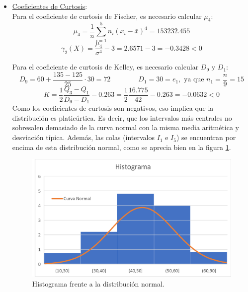 \begin{ejercicio}
\begin{enumerate}
\begin{itemize}
            \item \underline{Coeficientes de Curtosis}:\\
            Para el coeficiente de curtosis de Fischer, es necesario calcular $\mu_4$:
            $$\mu_4 = \frac{1}{n}\sum_{i=1}^5n_i(x_i-\bar{x})^4 = 153232.455$$
            $$\gamma_2(X) = \frac{\mu_4}{\sigma^4} -3 = 2.6571-3 = -0.3428 < 0$$
            
            Para el coeficiente de curtosis de Kelley, es necesario calcular $D_9$ y $D_1$:
            $$D_{9} = 60 + \frac{135-125}{25}\cdot 30 = 72
            \qquad \qquad
            D_{1} = 30 = e_1,\text{ ya que } n_1 = \frac{n}{9}=15$$
            $$K=\frac{1}{2}\frac{Q_3-Q_1}{D_9-D_1}-0.263 =
            \frac{1}{2}\frac{16.775}{42}-0.263 = -0.0632 < 0$$
            Como los coeficientes de curtosis son negativos, eso implica que la distribución es platicúrtica. Es decir, que los intervalos más centrales no sobresalen demasiado de la curva normal con la misma media aritmética y desviación típica. Además, las colas (intervalos $I_1$ e $I_5$) se encuentran por encima de esta distribución normal, como se aprecia bien en la figura \ref{fig:Ej10.Curtosis}.
            \begin{figure}[H]
                \centering
                \includegraphics[width=0.8\linewidth]{Imagenes/Ej10.Curtosis.png}
                \caption{Histograma frente a la distribución normal.}
                \label{fig:Ej10.Curtosis}
            \end{figure}
        \end{itemize}
    \end{enumerate}
\end{ejercicio}